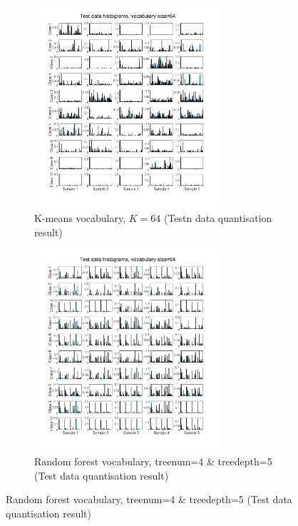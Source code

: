 \begin{figure}[htbp]
	\centering
	\begin{subfigure}[t]{0.5\linewidth}
		\centering
		\includegraphics[height=7.5cm]{image/q1-appendix/test_64.png} 
		\caption{K-means vocabulary, $K=64$ (Testn data quantisation result)}
	\end{subfigure}%
	\hfill
	\begin{subfigure}[t]{0.5\linewidth}
		\centering
		\includegraphics[height=7.5cm]{image/q3-appendix/RFtest-64.png}
		\caption{Random forest vocabulary, treenum=4 \& treedepth=5 (Test data quantisation result)}
	\end{subfigure}
	

\end{figure}
